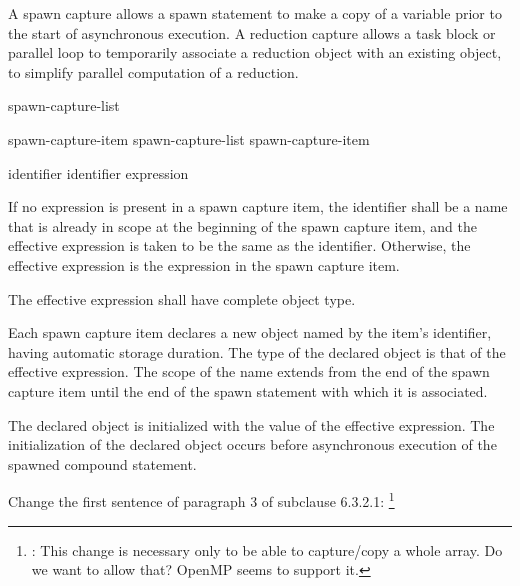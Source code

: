

\pnum
A spawn capture allows a spawn statement
to make a copy of a variable
prior to the start of asynchronous execution.
A reduction capture allows a task block or parallel loop
to temporarily associate a reduction object
with an existing object,
to simplify parallel computation of a reduction.



\begin{bnf}
\br
{} \terminal{(} spawn-capture-list \terminal{)}
\end{bnf}

\begin{bnf}
\br
spawn-capture-item
\br
spawn-capture-list \terminal{,} spawn-capture-item
\end{bnf}

\begin{bnf}
\br
identifier
\br
identifier \terminal{=} expression
\end{bnf}


\pnum
If no expression is present in a spawn capture item,
the identifier shall be a name that is already in scope
at the beginning of the spawn capture item,
and the effective expression is taken to be the same as the identifier.
Otherwise, the effective expression
is the expression in the spawn capture item.

\pnum
The effective expression shall have complete object type.


\pnum
Each spawn capture item declares a new object
named by the item's identifier,
having automatic storage duration.
The type of the declared object is that of the effective expression.
The scope of the name extends from the end of the spawn capture item
until the end of the spawn statement with which it is associated.

\pnum
The declared object is initialized
with the value of the effective expression.
The initialization of the declared object
occurs before asynchronous execution
of the spawned compound statement.

\pnum
Change the first sentence of paragraph 3 of subclause 6.3.2.1:
\footnote{:
This change is necessary only to be able to capture/copy a whole array.
Do we want to allow that?
OpenMP seems to support it.
}

